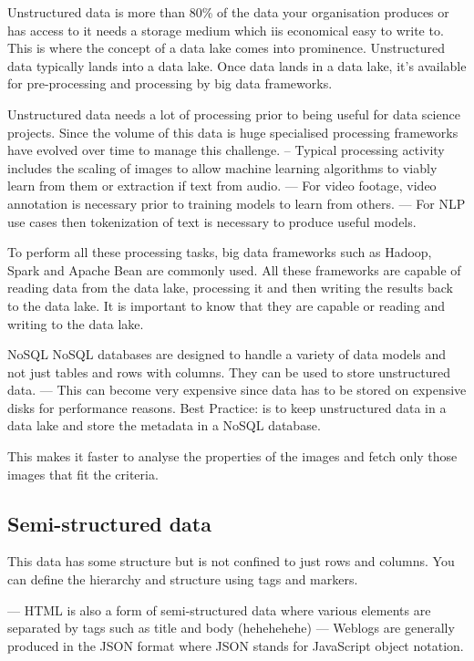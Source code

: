 \documentclass[11pt]{article}
\begin{document}
    Unstructured data is more than 80\% of the data your organisation produces or has access to it needs a storage medium which iis economical easy to write to.
    This is where the concept of a data lake comes into prominence.
    Unstructured data typically lands into a data lake.
    Once data lands in a data lake, it's available for pre-processing and processing by big data frameworks.

    Unstructured data needs a lot of processing prior to being useful for data science projects.
    Since the volume of this data is huge specialised processing frameworks have evolved over time to manage this challenge.
    -- Typical processing activity includes the scaling of images to allow machine learning algorithms to viably learn from them or extraction if text from audio.
    --- For video footage, video annotation is necessary prior to training models to learn from others.
    --- For NLP use cases then tokenization of text is necessary to produce useful models.

    To perform all these processing tasks, big data frameworks such as Hadoop, Spark and Apache Bean are commonly used.
    All these frameworks are capable of reading data from the data lake, processing it and then writing the results back to the data lake.
    It is important to know that they are capable or reading and writing to the data lake.

    NoSQL
    NoSQL databases are designed to handle a variety of data models and not just tables and rows with columns.
    They can be used to store unstructured data.
    --- This can become very expensive since data has to be stored on expensive disks for performance reasons.
    Best Practice: is to keep unstructured data in a data lake and store the metadata in a NoSQL database.

    This makes it faster to analyse the properties of the images and fetch only those images that fit the criteria.

    \subsection{Semi-structured data}
    This data has some structure but is not confined to just rows and columns.
    You can define the hierarchy and structure using tags and markers.

    --- HTML is also a form of semi-structured data where various elements are separated by tags such as title and body (hehehehehe)
    --- Weblogs are generally produced in the JSON format where JSON stands for JavaScript object notation.
\end{document}
